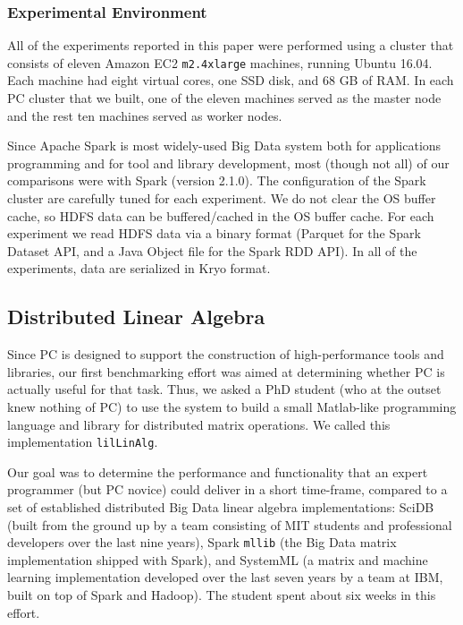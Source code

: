 \subsubsection {Experimental Environment}
All of the experiments reported in this paper were performed using a
cluster that consists of eleven Amazon EC2 \texttt{m2.4xlarge} machines,
running Ubuntu 16.04. Each machine had eight virtual cores, one SSD
disk, and 68 GB of RAM. In each PC cluster that we built, one of the eleven machines served as the master
node and the rest ten machines served as worker nodes.

Since Apache Spark is most widely-used Big Data system both for applications programming and for tool and library
development, most
(though not all) of our comparisons were with Spark (version
2.1.0). The configuration of the Spark cluster are carefully tuned for each
experiment. We do not clear the OS buffer cache, so HDFS data can be
buffered/cached in the OS buffer cache. For each experiment we read
HDFS data via a binary format (Parquet for the Spark Dataset API,
and a Java Object file for the Spark RDD API).  In all of the
experiments, data are serialized in Kryo format. 


\subsection {Distributed Linear Algebra}
Since PC is designed to support the construction
of high-performance tools and libraries, our first benchmarking effort was aimed at determining 
whether PC is actually useful for that task.  Thus, we asked
a PhD student (who at the outset knew nothing of PC) 
to use the system to build a small Matlab-like 
programming language and library for distributed matrix operations.
We called this implementation \texttt{lilLinAlg}.

Our goal was to determine the 
performance and functionality that an expert programmer (but PC novice) could deliver in a short
time-frame, compared to a set of established distributed Big Data linear algebra implementations:
SciDB \cite{brown2010overview, stonebraker2011architecture} (built from the ground up by a team
consisting of MIT students and professional developers over the last
nine years), Spark \texttt{mllib} \cite{meng2016mllib} 
(the Big Data matrix
implementation shipped with Spark), and SystemML \cite{boehm2014hybrid, ghoting2011systemml, boehm2016systemml}
(a matrix and machine learning implementation developed
over the last seven years by a team at IBM, built on top of Spark and Hadoop).
The student spent about six weeks in this effort.

